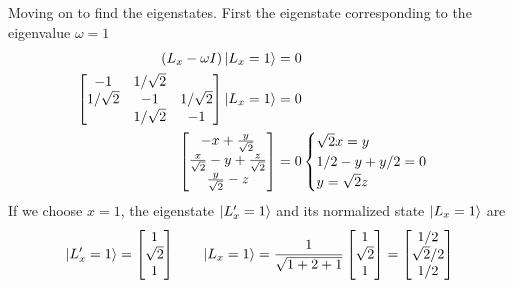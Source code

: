 \documentclass[../../../main.tex]{subfiles}
\begin{document}
Moving on to find the eigenstates.
First the eigenstate corresponding to the eigenvalue $\omega=1$
\begin{align*}
    \left( L_x -\omega I  \right) \ket{L_x=1} & = 0 \\
    \begin{bmatrix}
        -1         & 1/\sqrt{2 } &            \\
        1/\sqrt{2} & -1          & 1/\sqrt{2} \\
                   & 1/\sqrt{2}  & -1         \\
    \end{bmatrix}
    \ket{L_x=1}                               & = 0 \\
    \begin{bmatrix}
        -x+\frac{y }{\sqrt{2 }}                      \\
        \frac{x }{\sqrt{2 }}-y +\frac{z }{\sqrt{2 }} \\
        \frac{y }{\sqrt{2 }}-z
    \end{bmatrix}
                                              & = 0
    \begin{cases}
        \sqrt{2 }x=y \\
        1/2-y+y/2=0  \\
        y=\sqrt{2 }z
    \end{cases}
\end{align*}
If we choose $x=1$, the eigenstate $\ket{L_x'=1}$ and its normalized state $\ket{L_x=1}$ are
\begin{equation*}
    \ket{L_x'=1}=
    \begin{bmatrix}
        1        \\
        \sqrt{2} \\
        1        \\
    \end{bmatrix}
    \qquad
    \ket{L_x=1}=
    \frac{1}{\sqrt{1+2+1}}
    \begin{bmatrix}
        1        \\
        \sqrt{2} \\
        1        \\
    \end{bmatrix}
    =
    \begin{bmatrix}
        1/2        \\
        \sqrt{2}/2 \\
        1/2        \\
    \end{bmatrix}
\end{equation*}
\end{document}
